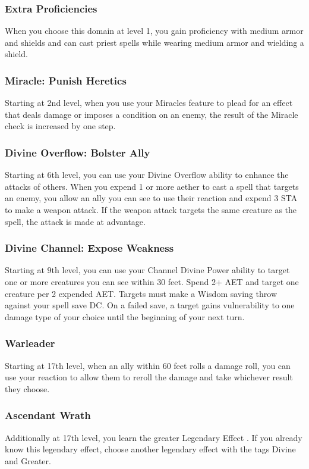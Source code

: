 \subsubsection{Extra Proficiencies}
When you choose this domain at level 1, you gain proficiency with medium armor and shields and can cast priest spells while wearing medium armor and wielding a shield.

\subsubsection{Miracle: Punish Heretics}
Starting at 2nd level, when you use your Miracles feature to plead for an effect that deals damage or imposes a condition on an enemy, the result of the Miracle check is increased by one step.

\subsubsection{Divine Overflow: Bolster Ally}
Starting at 6th level, you can use your Divine Overflow ability to enhance the attacks of others. When you expend 1 or more aether to cast a spell that targets an enemy, you allow an ally you can see to use their reaction and expend 3 STA to make a weapon attack. If the weapon attack targets the same creature as the spell, the attack is made at advantage.

\subsubsection{Divine Channel: Expose Weakness}
Starting at 9th level, you can use your Channel Divine Power ability to target one or more creatures you can see within 30 feet. Spend 2+ AET and target one creature per 2 expended AET. Targets must make a Wisdom saving throw against your spell save DC. On a failed save, a target gains vulnerability to one damage type of your choice until the beginning of your next turn.

\subsubsection{Warleader}
Starting at 17th level, when an ally within 60 feet rolls a damage roll, you can use your reaction to allow them to reroll the damage and take whichever result they choose.

\subsubsection{Ascendant Wrath}
Additionally at 17th level, you learn the greater Legendary Effect . If you already know this legendary effect, choose another legendary effect with the tags Divine and Greater.

